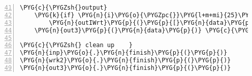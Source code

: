 \begin{Verbatim}[commandchars=\\\{\},numbers=left,firstnumber=41,stepnumber=1,codes={\catcode`\$=3\catcode`\^=7\catcode`\_=8}]
    \PYG{c}{\PYGZsh{}output}
    \PYG{k}{if} \PYG{n}{i}\PYG{o}{\PYGZpc{}}\PYG{l+m+mi}{25}\PYG{o}{==}\PYG{l+m+mi}{0}\PYG{p}{:} \PYG{c}{\PYGZsh{}save each 25th frame}
        \PYG{n}{outIWrt}\PYG{p}{(}\PYG{p}{[}\PYG{n}{data}\PYG{p}{[}\PYG{l+m+mi}{0}\PYG{p}{]}\PYG{p}{,}\PYG{n}{wrk2}\PYG{o}{.}\PYG{n}{lastpic}\PYG{p}{]}\PYG{p}{)}
    \PYG{n}{out3}\PYG{p}{(}\PYG{n}{data}\PYG{p}{)} \PYG{c}{\PYGZsh{}write to csv}

\PYG{c}{\PYGZsh{} clean up    }
\PYG{n}{inp}\PYG{o}{.}\PYG{n}{finish}\PYG{p}{(}\PYG{p}{)}
\PYG{n}{wrk2}\PYG{o}{.}\PYG{n}{finish}\PYG{p}{(}\PYG{p}{)}
\PYG{n}{out3}\PYG{o}{.}\PYG{n}{finish}\PYG{p}{(}\PYG{p}{)}
\end{Verbatim}
